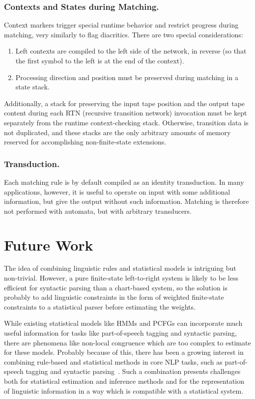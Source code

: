 \documentclass{llncs}
\begin{document}
\subsubsection{Contexts and States during Matching.}
Context markers trigger special runtime behavior and restrict
progress during matching, very similarly to flag diacritics.
There are two special considerations:

\begin{enumerate}
\item Left contexts are compiled to the left side of the network, in reverse
(so that the first symbol to the left is at the end of the context).
\item Processing direction and position must be preserved during
matching in a state stack.
\end{enumerate}

Additionally, a stack for preserving the input tape position
and the output tape content during each RTN (recursive transition
network) invocation must be kept separately from the runtime
context-checking stack. Otherwise, transition data is not duplicated,
and these stacks are the only arbitrary amounts of memory reserved
for accomplishing non-finite-state extensions.

\subsubsection{Transduction.}
Each matching rule is by default compiled as an identity transduction.
In many applications, however, it is useful to operate on input
with some additional information, but give the output
without such information. Matching is therefore not
performed with automata, but with arbitrary transducers.

\section{Future Work}\label{hfst:discussion}

The idea of combining linguistic rules and statistical models is intriguing but non-trivial. However, a pure finite-state left-to-right system is likely to be less efficient for syntactic parsing than a chart-based system, so the solution is probably to add linguistic constraints in the form of weighted finite-state constraints to a statistical parser before estimating the weights.

While existing statistical models like HMMs and PCFGs can incorporate
much useful information for tasks like part-of-speech tagging and
syntactic parsing, there are phenomena like non-local congruence which are
too complex to estimate for these models. Probably because of this, there
has been a growing interest in combining rule-based and statistical
methods in core NLP tasks, such as part-of-speech tagging and syntactic
parsing~\cite{manning/2011}. Such a combination presents challenges
both for statistical estimation and inference methods and for the
representation of linguistic information in a way which is compatible
with a statistical system.
\end{document}
